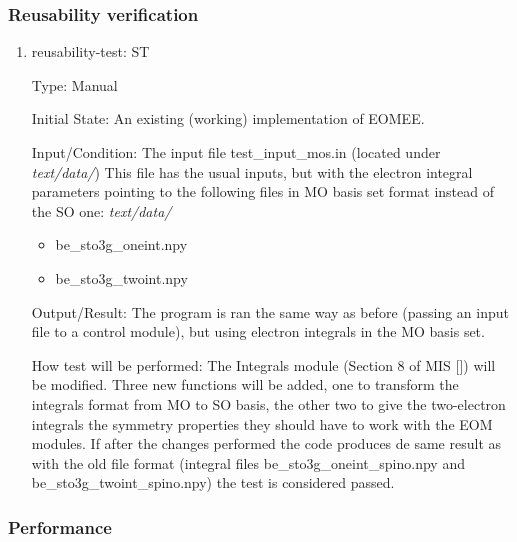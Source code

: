 \documentclass[12pt, titlepage]{article}
\newcounter{systnum} %
\begin{document}
\subsubsection{Reusability verification}
\label{section:reusability}


\begin{enumerate}
	
	\item{reusability-test: ST\thesystnum \label{ST7}}
	
	Type: Manual
	
	Initial State: An existing (working) implementation of EOMEE.
	
	Input/Condition: The input file test\_input\_mos.in (located under 
	\textit{text/data/})
	This file has the usual inputs, but with the electron 
	integral parameters pointing to the following files in MO basis 
	set format instead of the SO one:
	\textit{text/data/}
	\begin{itemize}
		\item be\_sto3g\_oneint.npy
		\item be\_sto3g\_twoint.npy
	\end{itemize}
	
	Output/Result: The program is ran the same way as before (passing an input 
	file to a control module), but using electron integrals in the MO basis set.
	
	How test will be performed: The Integrals module (Section 8 of MIS 
	[\cite{MIS2020}]) will be modified. Three new functions will be added, one 
	to transform the integrals format from MO to SO basis, the 
	other two to give the two-electron integrals the symmetry properties they 
	should have to work with the EOM modules. If after the changes performed 
	the code produces de same result as with the old file format (integral 
	files be\_sto3g\_oneint\_spino.npy and be\_sto3g\_twoint\_spino.npy) the 
	test is considered passed.
	
\end{enumerate}

\subsubsection{Performance}
\label{section:performance}
\end{document}
